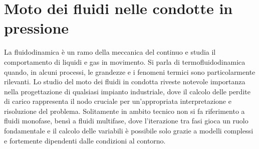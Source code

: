 \clearpage{\pagestyle{empty}\cleardoublepage}
\chapter{Moto dei fluidi nelle condotte in pressione}\label{ch:fluidodinamica}\thispagestyle{empty} 
La fluidodinamica è un ramo della meccanica del continuo e studia il comportamento di liquidi e gas in movimento. Si parla di termofluidodinamica quando, in alcuni processi, le grandezze e i fenomeni termici sono particolarmente rilevanti. Lo studio del moto dei fluidi in condotta riveste notevole importanza nella progettazione di qualsiasi impianto industriale, dove il calcolo delle perdite di carico rappresenta il nodo cruciale per un'appropriata interpretazione e risoluzione del problema. Solitamente in ambito tecnico non si fa riferimento a fluidi monofase, bensì a fluidi multifase, dove l'iterazione tra fasi gioca un ruolo fondamentale e il calcolo delle variabili è possibile solo grazie a modelli complessi e fortemente dipendenti dalle condizioni al contorno. 

